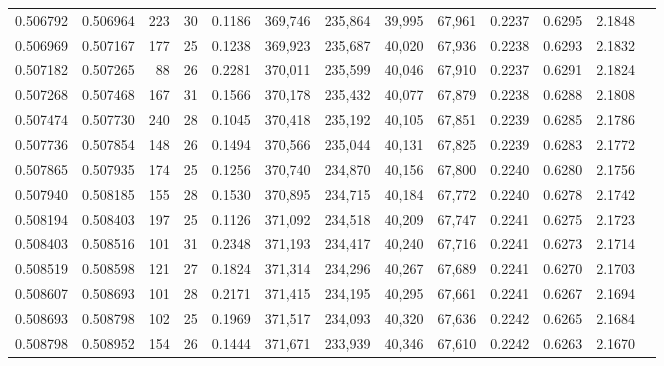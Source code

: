 \begin{tabular}{rrrrrrrrrrrrr}
0.506792 & 0.506964 &   223 &  30 &                                     0.1186 & 369,746 & 235,864 &  39,995 &  67,961 & 0.2237 & 0.6295 & 2.1848 \\
0.506969 & 0.507167 &   177 &  25 &                                     0.1238 & 369,923 & 235,687 &  40,020 &  67,936 & 0.2238 & 0.6293 & 2.1832 \\
0.507182 & 0.507265 &    88 &  26 &                                     0.2281 & 370,011 & 235,599 &  40,046 &  67,910 & 0.2237 & 0.6291 & 2.1824 \\
0.507268 & 0.507468 &   167 &  31 &                                     0.1566 & 370,178 & 235,432 &  40,077 &  67,879 & 0.2238 & 0.6288 & 2.1808 \\
0.507474 & 0.507730 &   240 &  28 &                                     0.1045 & 370,418 & 235,192 &  40,105 &  67,851 & 0.2239 & 0.6285 & 2.1786 \\
0.507736 & 0.507854 &   148 &  26 &                                     0.1494 & 370,566 & 235,044 &  40,131 &  67,825 & 0.2239 & 0.6283 & 2.1772 \\
0.507865 & 0.507935 &   174 &  25 &                                     0.1256 & 370,740 & 234,870 &  40,156 &  67,800 & 0.2240 & 0.6280 & 2.1756 \\
0.507940 & 0.508185 &   155 &  28 &                                     0.1530 & 370,895 & 234,715 &  40,184 &  67,772 & 0.2240 & 0.6278 & 2.1742 \\
0.508194 & 0.508403 &   197 &  25 &                                     0.1126 & 371,092 & 234,518 &  40,209 &  67,747 & 0.2241 & 0.6275 & 2.1723 \\
0.508403 & 0.508516 &   101 &  31 &                                     0.2348 & 371,193 & 234,417 &  40,240 &  67,716 & 0.2241 & 0.6273 & 2.1714 \\
0.508519 & 0.508598 &   121 &  27 &                                     0.1824 & 371,314 & 234,296 &  40,267 &  67,689 & 0.2241 & 0.6270 & 2.1703 \\
0.508607 & 0.508693 &   101 &  28 &                                     0.2171 & 371,415 & 234,195 &  40,295 &  67,661 & 0.2241 & 0.6267 & 2.1694 \\
0.508693 & 0.508798 &   102 &  25 &                                     0.1969 & 371,517 & 234,093 &  40,320 &  67,636 & 0.2242 & 0.6265 & 2.1684 \\
0.508798 & 0.508952 &   154 &  26 &                                     0.1444 & 371,671 & 233,939 &  40,346 &  67,610 & 0.2242 & 0.6263 & 2.1670 \\

\end{tabular}
